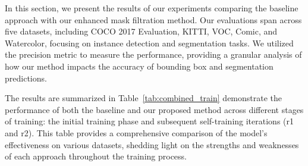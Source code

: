 \begin{table}[htbp]
	\centering
	\caption[\textbf{\(AP_{segm}\) and \(AP50_{segm}\) for Training and Self-Training}]{\textbf{\(AP_{segm}\) and \(AP50_{segm}\) for Training and Self-Training} evaluated on COCO Eval dataset (Batch size 8)}
	\label{tab:combined_train_segm}
\end{table}

In this section, we present the results of our experiments comparing the baseline approach with our enhanced mask filtration method. Our evaluations span across five datasets, including COCO 2017 Evaluation, KITTI, VOC, Comic, and Watercolor, focusing on instance detection and segmentation tasks. We utilized the precision metric to measure the performance, providing a granular analysis of how our method impacts the accuracy of bounding box and segmentation predictions.

The results are summarized in Table~\ref{tab:combined_train} demonstrate the performance of both the baseline and our proposed method across different stages of training: the initial training phase and subsequent self-training iterations (r1 and r2). This table provides a comprehensive comparison of the model’s effectiveness on various datasets, shedding light on the strengths and weaknesses of each approach throughout the training process. 

